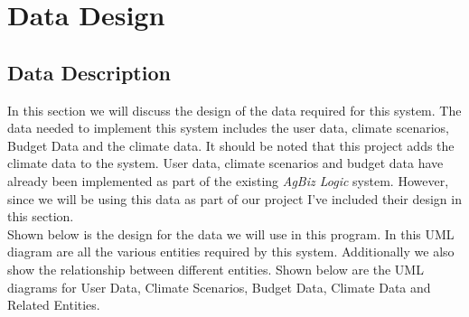 \documentclass[onecolumn, draftclsnofoot,10pt, compsoc]{article}
\begin{document}
\section{Data Design}
	\subsection{Data Description}
		In this section we will discuss the design of the data required for this system. The data needed to implement this system includes the user data, climate scenarios, Budget Data and the climate data. It should be noted that this project adds the climate data to the system. User data, climate scenarios and budget data have already been implemented as part of the existing \textit{AgBiz Logic} system. However, since we will be using this data as part of our project I've included their design in this section.\\
		Shown below is the design for the data we will use in this program. In this UML diagram are all the various entities required by this system. Additionally we also show the relationship between different entities. Shown below are the UML diagrams for User Data, Climate Scenarios, Budget Data, Climate Data and Related Entities.\\

\clearpage
\end{document}
